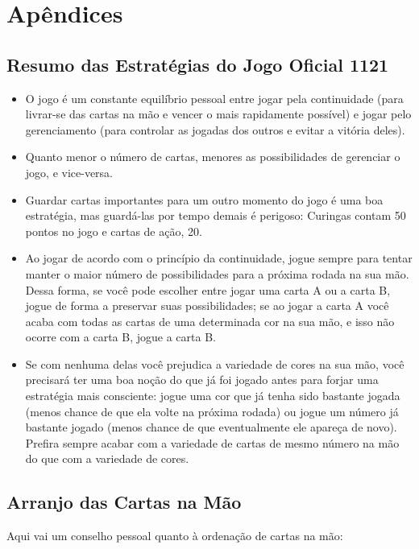 \chapter{Apêndices}

\appendix

\section{Resumo das Estratégias do Jogo Oficial 1121}

\begin{itemize}
\item{O jogo é um constante equilíbrio pessoal entre jogar pela continuidade (para livrar-se das cartas na mão e vencer o mais rapidamente possível) e jogar pelo gerenciamento (para controlar as jogadas dos outros e evitar a vitória deles).}
\item{Quanto menor o número de cartas, menores as possibilidades de gerenciar o jogo, e vice-versa.}
\item{Guardar cartas importantes para um outro momento do jogo é uma boa estratégia, mas guardá-las por tempo demais é perigoso: Curingas contam 50 pontos no jogo e cartas de ação, 20.}
\item{Ao jogar de acordo com o princípio da continuidade, jogue sempre para tentar manter o maior número de possibilidades para a próxima rodada na sua mão. Dessa forma, se você pode escolher entre jogar uma carta A ou a carta B, jogue de forma a preservar suas possibilidades; se ao jogar a carta A você acaba com todas as cartas de uma determinada cor na sua mão, e isso não ocorre com a carta B, jogue a carta B.}
\item{Se com nenhuma delas você prejudica a variedade de cores na sua mão, você precisará ter uma boa noção do que já foi jogado antes para forjar uma estratégia mais consciente: jogue uma cor que já tenha sido bastante jogada (menos chance de que ela volte na próxima rodada) ou jogue um número já bastante jogado (menos chance de que eventualmente ele apareça de novo). Prefira sempre acabar com a variedade de cartas de mesmo número na mão do que com a variedade de cores.}
\end{itemize}

\newpage

\section{Arranjo das Cartas na Mão}

Aqui vai um conselho pessoal quanto à ordenação de cartas na mão:

